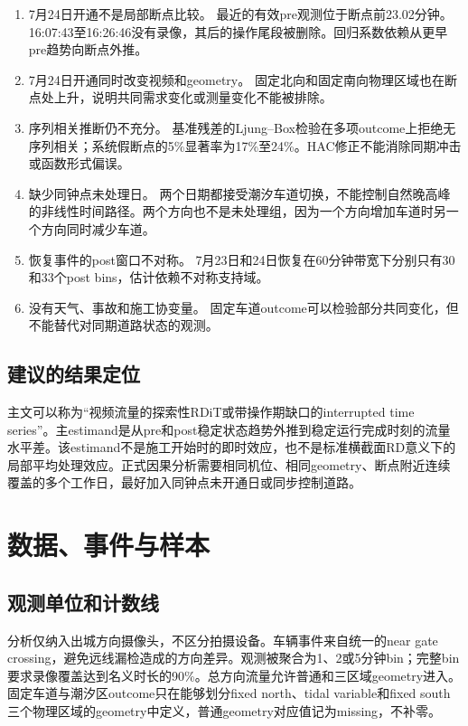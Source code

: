 \documentclass[11pt,a4paper]{ctexart}
\newcommand{\risk}[1]{\textcolor{red!65!black}{#1}}
\newcommand{\caution}[1]{\textcolor{orange!65!black}{#1}}
\begin{document}
\begin{enumerate}[leftmargin=2.4em]
  \item \risk{7月24日开通不是局部断点比较。} 最近的有效pre观测位于断点前23.02分钟。16:07:43至16:26:46没有录像，其后的操作尾段被删除。回归系数依赖从更早pre趋势向断点外推。
  \item \risk{7月24日开通同时改变视频和geometry。} 固定北向和固定南向物理区域也在断点处上升，说明共同需求变化或测量变化不能被排除。
  \item \risk{序列相关推断仍不充分。} 基准残差的Ljung--Box检验在多项outcome上拒绝无序列相关；系统假断点的5\%显著率为17\%至24\%。HAC修正不能消除同期冲击或函数形式偏误。
  \item \risk{缺少同钟点未处理日。} 两个日期都接受潮汐车道切换，不能控制自然晚高峰的非线性时间路径。两个方向也不是未处理组，因为一个方向增加车道时另一个方向同时减少车道。
  \item \caution{恢复事件的post窗口不对称。} 7月23日和24日恢复在60分钟带宽下分别只有30和33个post bins，估计依赖不对称支持域。
  \item \caution{没有天气、事故和施工协变量。} 固定车道outcome可以检验部分共同变化，但不能替代对同期道路状态的观测。
\end{enumerate}

\subsection{建议的结果定位}

主文可以称为“视频流量的探索性RDiT或带操作期缺口的interrupted time series”。主estimand是从pre和post稳定状态趋势外推到稳定运行完成时刻的流量水平差。该estimand不是施工开始时的即时效应，也不是标准横截面RD意义下的局部平均处理效应。正式因果分析需要相同机位、相同geometry、断点附近连续覆盖的多个工作日，最好加入同钟点未开通日或同步控制道路。

\section{数据、事件与样本}

\subsection{观测单位和计数线}

分析仅纳入出城方向摄像头，不区分拍摄设备。车辆事件来自统一的near gate crossing，避免远线漏检造成的方向差异。观测被聚合为1、2或5分钟bin；完整bin要求录像覆盖达到名义时长的90\%。总方向流量允许普通和三区域geometry进入。固定车道与潮汐区outcome只在能够划分fixed north、tidal variable和fixed south三个物理区域的geometry中定义，普通geometry对应值记为missing，不补零。
\end{document}
